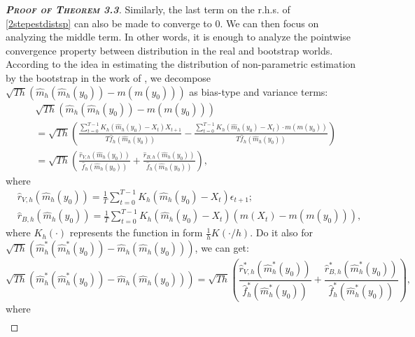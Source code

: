 \documentclass[a4paper]{article}
\begin{document}
\begin{proof}[\textbf{\textsc{Proof of Theorem 3.3}}]
Similarly, the last term on the r.h.s. of \cref{2stepestdistsp} can also be made to converge to 0. We can then focus on analyzing the middle term. In other words, it is enough to analyze the pointwise convergence property between distribution in the real and bootstrap worlds. According to the idea in estimating the distribution of non-parametric estimation by the bootstrap in the work of \cite{franke2002bootstrap}, we decompose $\sqrt{Th}\left(\widehat{m}_{h}(\widehat{m}_{h}(y_0)) -  m(m(y_0))   \right)$ as bias-type and variance terms:
\begin{equation}
\begin{split}
    &\sqrt{Th}\left(\widehat{m}_{h}(\widehat{m}_{h}(y_0)) -  m(m(y_0))   \right) \\
    & = \sqrt{Th}\left( \frac{\sum_{t=0}^{T-1}K_h(\widehat{m}_h(y_0)-X_t)X_{t+1}}{T\hat{f}_{h}(\widehat{m}_{h}(y_0))}  -   \frac{\sum_{t=0}^{T-1}K_h(\widehat{m}_h(y_0)-X_t)\cdot m(m(y_0)) }{T\hat{f}_{h}(\widehat{m}_{h}(y_0))}     \right)\\
    &= \sqrt{Th}\left( \frac{\hat{r}_{V,h}(\widehat{m}_{h}(y_0))}{\hat{f}_{h}(\widehat{m}_{h}(y_0))} +  \frac{\hat{r}_{B,h}(\widehat{m}_{h}(y_0))}{\hat{f}_{h}(\widehat{m}_{h}(y_0))} \right),
\end{split}
\end{equation}
where 
\begin{equation}
\begin{split}
    &\hat{r}_{V,h}(\widehat{m}_{h}(y_0)) = \frac{1}{T}\sum_{t=0}^{T-1}K_h(\widehat{m}_h(y_0)-X_t)\epsilon_{t+1};\\
    &\hat{r}_{B,h}(\widehat{m}_{h}(y_0)) =  \frac{1}{T}\sum_{t=0}^{T-1}K_h(\widehat{m}_h(y_0)-X_t)\left(m(X_t) -  m(m(y_0))    \right),
\end{split}
\end{equation}
where $K_h(\cdot)$ represents the function in form $\frac{1}{h}K(\cdot/h)$. Do it also for $\sqrt{Th}\left( \widehat{m}^*_{h}(\widehat{m}^*_{h}(y_0))- \widehat{m}_{h}(\widehat{m}_{h}(y_0))   \right)$, we can get:
\begin{equation}
\sqrt{Th}\left( \widehat{m}^*_{h}(\widehat{m}^*_{h}(y_0))- \widehat{m}_{h}(\widehat{m}_{h}(y_0))   \right) = \sqrt{Th}\left( \frac{\hat{r}^*_{V,h}(\widehat{m}^*_{h}(y_0))}{\hat{f}^*_{h}(\widehat{m}^*_{h}(y_0))} +  \frac{\hat{r}^*_{B,h}(\widehat{m}^*_{h}(y_0))}{\hat{f}^*_{h}(\widehat{m}^*_{h}(y_0))} \right),
\end{equation}
where 
\begin{equation}
\begin{split}

\end{split}
\end{equation}
\end{proof}
\end{document}
